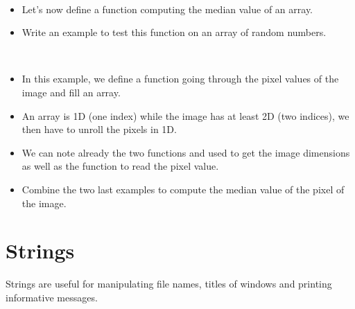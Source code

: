 \begin{frame}
  \begin{example}~\par
    \begin{itemize}
    \item Let's now define a function computing the median value of an array.\par
      
    \item Write an example to test this function on an array of random numbers.
    \end{itemize}

  \end{example}
\end{frame}

\begin{frame}
  \begin{example}~\par
    \begin{itemize}
    \item In this example, we define a function going through the pixel
      values of the image and fill an array.
    \item An array is 1D (one index) while the image has at least 2D
      (two indices), we then have to unroll the pixels in 1D.
      
    \item We can note already the two functions  and
       used to get the image dimensions as well as the
      function  to read the pixel value.
    \item Combine the two last examples to compute the median value of
      the pixel of the image.
    \end{itemize}
  \end{example}
\end{frame}

\section{Strings}

Strings are useful for manipulating file names, titles of windows and printing
informative messages.

